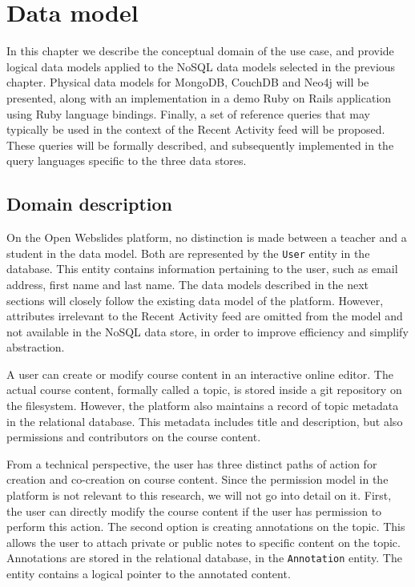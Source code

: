 \chapter{Data model}
\label{ch:data-model}

In this chapter we describe the conceptual domain of the use case, and provide logical data models applied to the NoSQL data models selected in the previous chapter.
Physical data models for MongoDB, CouchDB and Neo4j will be presented, along with an implementation in a demo Ruby on Rails application using Ruby language bindings.
Finally, a set of reference queries that may typically be used in the context of the Recent Activity feed will be proposed.
These queries will be formally described, and subsequently implemented in the query languages specific to the three data stores.

\section{Domain description}
\label{sec:domain-description}

On the Open Webslides platform, no distinction is made between a teacher and a student in the data model.
Both are represented by the \texttt{User} entity in the database.
This entity contains information pertaining to the user, such as email address, first name and last name.
The data models described in the next sections will closely follow the existing data model of the platform.
However, attributes irrelevant to the Recent Activity feed are omitted from the model and not available in the NoSQL data store, in order to improve efficiency and simplify abstraction.

A user can create or modify course content in an interactive online editor.
The actual course content, formally called a topic, is stored inside a git repository on the filesystem.
However, the platform also maintains a record of topic metadata in the relational database.
This metadata includes title and description, but also permissions and contributors on the course content.

From a technical perspective, the user has three distinct paths of action for creation and co-creation on course content.
Since the permission model in the platform is not relevant to this research, we will not go into detail on it.
First, the user can directly modify the course content if the user has permission to perform this action.
The second option is creating annotations on the topic.
This allows the user to attach private or public notes to specific content on the topic.
Annotations are stored in the relational database, in the \texttt{Annotation} entity.
The entity contains a logical pointer to the annotated content.

